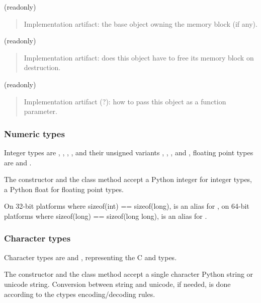  (readonly)
\begin{quote}

Implementation artifact: the base object owning the memory block
(if any).
\end{quote}

 (readonly)
\begin{quote}

Implementation artifact: does this object have to free its memory
block on destruction.
\end{quote}

 (readonly)
\begin{quote}

Implementation artifact (?): how to pass this object as a function
parameter.
\end{quote}


\subsubsection{Numeric types\label{ctypes-numeric-types}}

Integer types are , , , ,
 and their unsigned variants , ,
,  and , floating point types are
 and .

The constructor and the  class method accept a Python
integer for integer types, a Python float for floating point types.

On 32-bit platforms where sizeof(int) == sizeof(long),  is an
alias for , on 64-bit platforms where sizeof(long) ==
sizeof(long long),  is an alias for .


\subsubsection{Character types\label{ctypes-character-types}}

Character types are  and , representing the C
 and  types.

The constructor and the  class method accept a single
character Python string or unicode string.  Conversion between string
and unicode, if needed, is done according to the ctypes
encoding/decoding rules.


